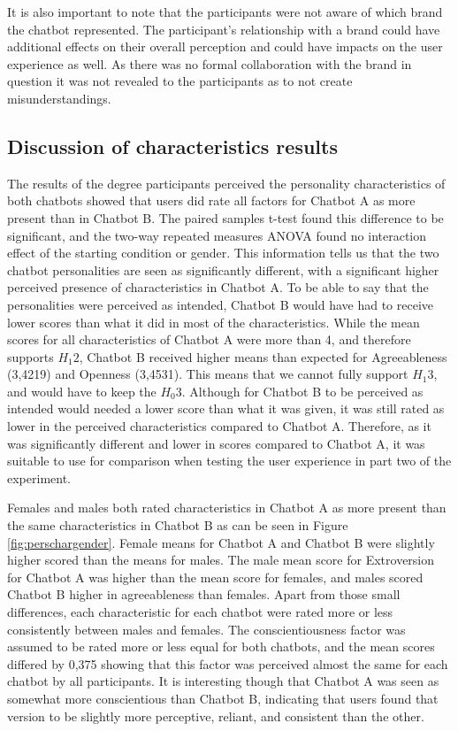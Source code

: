 It is also important to note that the participants were not aware of which brand the chatbot represented. The participant's relationship with a brand could have additional effects on their overall perception and could have impacts on the user experience as well. As there was no formal collaboration with the brand in question it was not revealed to the participants as to not create misunderstandings.

\vspace{2,5mm}

\subsection{Discussion of characteristics results}
The results of the degree participants perceived the personality characteristics of both chatbots showed that users did rate all factors for Chatbot A as more present than in Chatbot B. The paired samples t-test found this difference to be significant, and the two-way repeated measures ANOVA found no interaction effect of the starting condition or gender. This information tells us that the two chatbot personalities are seen as significantly different, with a significant higher perceived presence of characteristics in Chatbot A. To be able to say that the personalities were perceived as intended, Chatbot B would have had to receive lower scores than what it did in most of the characteristics. While the mean scores for all characteristics of Chatbot A were more than 4, and therefore supports $H_1 2$, Chatbot B received higher means than expected for Agreeableness (3,4219) and Openness (3,4531). This means that we cannot fully support $H_1 3$, and would have to keep the $H_0 3$. Although for Chatbot B to be perceived as intended would needed a lower score than what it was given, it was still rated as lower in the perceived characteristics compared to Chatbot A. Therefore, as it was significantly different and lower in scores compared to Chatbot A, it was suitable to use for comparison when testing the user experience in part two of the experiment.

Females and males both rated characteristics in Chatbot A as more present than the same characteristics in Chatbot B as can be seen in Figure \ref{fig:perschargender}. Female means for Chatbot A and Chatbot B were slightly higher scored than the means for males. The male mean score for Extroversion for Chatbot A was higher than the mean score for females, and males scored Chatbot B higher in agreeableness than females. Apart from those small differences, each characteristic for each chatbot were rated more or less consistently between males and females. The conscientiousness factor was assumed to be rated more or less equal for both chatbots, and the mean scores differed by 0,375 showing that this factor was perceived almost the same for each chatbot by all participants. It is interesting though that Chatbot A was seen as somewhat more conscientious than Chatbot B, indicating that users found that version to be slightly more perceptive, reliant, and consistent than the other.  

